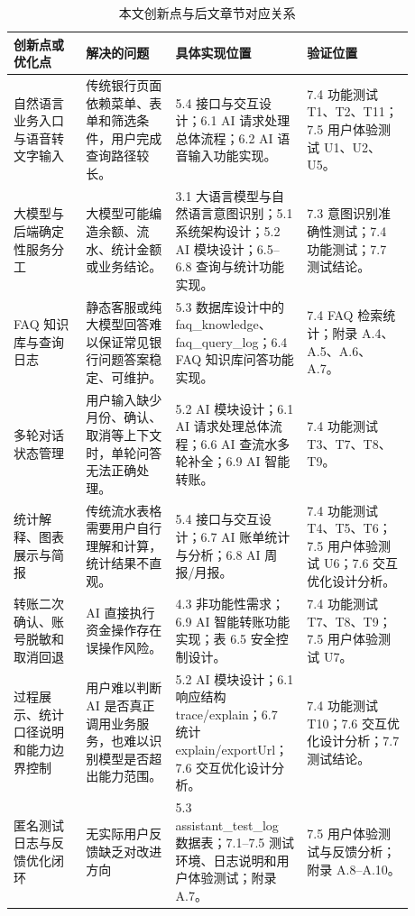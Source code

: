 \documentclass[bachelor, print]{xduthesis}
\begin{document}
\begin{table}[H]
    \centering
    \caption{本文创新点与后文章节对应关系}
    \label{tab:innovation-chapter-map}
    \scriptsize
    \setlength{\tabcolsep}{2pt}
    \renewcommand{\arraystretch}{1.15}
    \begin{tabular}{|p{0.17\linewidth}|p{0.21\linewidth}|p{0.25\linewidth}|p{0.25\linewidth}|}
        \hline
        创新点或优化点 & 解决的问题 & 具体实现位置 & 验证位置 \\
        \hline
        自然语言业务入口与语音转文字输入 & 传统银行页面依赖菜单、表单和筛选条件，用户完成查询路径较长。 & 5.4 接口与交互设计；6.1 AI 请求处理总体流程；6.2 AI 语音输入功能实现。 & 7.4 功能测试 T1、T2、T11；7.5 用户体验测试 U1、U2、U5。 \\
        \hline
        大模型与后端确定性服务分工 & 大模型可能编造余额、流水、统计金额或业务结论。 & 3.1 大语言模型与自然语言意图识别；5.1 系统架构设计；5.2 AI 模块设计；6.5--6.8 查询与统计功能实现。 & 7.3 意图识别准确性测试；7.4 功能测试；7.7 测试结论。 \\
        \hline
        FAQ 知识库与查询日志 & 静态客服或纯大模型回答难以保证常见银行问题答案稳定、可维护。 & 5.3 数据库设计中的 faq\_knowledge、faq\_query\_log；6.4 FAQ 知识库问答功能实现。 & 7.4 FAQ 检索统计；附录 A.4、A.5、A.6、A.7。 \\
        \hline
        多轮对话状态管理 & 用户输入缺少月份、确认、取消等上下文时，单轮问答无法正确处理。 & 5.2 AI 模块设计；6.1 AI 请求处理总体流程；6.6 AI 查流水多轮补全；6.9 AI 智能转账。 & 7.4 功能测试 T3、T7、T8、T9。 \\
        \hline
        统计解释、图表展示与简报 & 传统流水表格需要用户自行理解和计算，统计结果不直观。 & 5.4 接口与交互设计；6.7 AI 账单统计与分析；6.8 AI 周报/月报。 & 7.4 功能测试 T4、T5、T6；7.5 用户体验测试 U6；7.6 交互优化设计分析。 \\
        \hline
        转账二次确认、账号脱敏和取消回退 & AI 直接执行资金操作存在误操作风险。 & 4.3 非功能性需求；6.9 AI 智能转账功能实现；表 6.5 安全控制设计。 & 7.4 功能测试 T7、T8、T9；7.5 用户体验测试 U7。 \\
        \hline
        过程展示、统计口径说明和能力边界控制 & 用户难以判断 AI 是否真正调用业务服务，也难以识别模型是否超出能力范围。 & 5.2 AI 模块设计；6.1 响应结构 trace/explain；6.7 统计 explain/exportUrl；7.6 交互优化设计分析。 & 7.4 功能测试 T10；7.6 交互优化设计分析；7.7 测试结论。 \\
        \hline
        匿名测试日志与反馈优化闭环 & 无实际用户反馈缺乏对改进方向 & 5.3 assistant\_test\_log 数据表；7.1--7.5 测试环境、日志说明和用户体验测试；附录 A.7。 & 7.5 用户体验测试与反馈分析；附录 A.8--A.10。 \\
        \hline
    \end{tabular}
\end{table}
\end{document}
